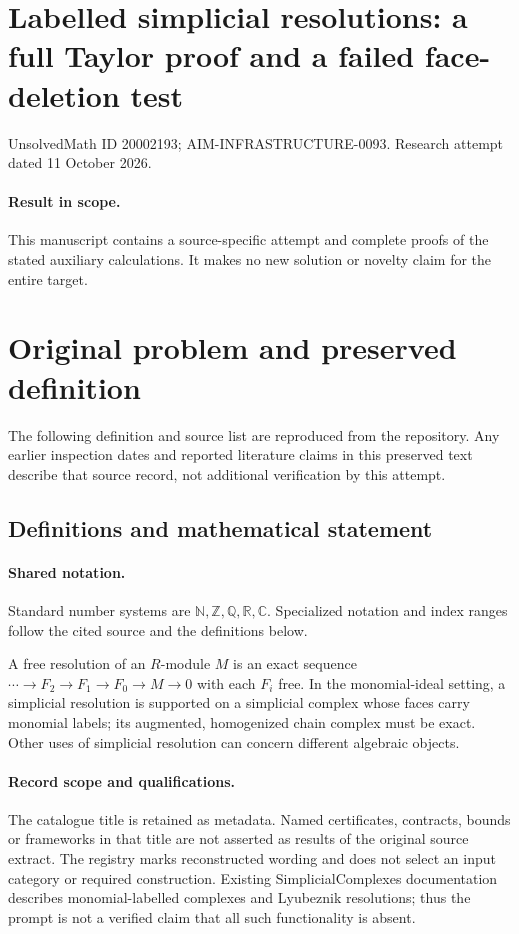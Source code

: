 \documentclass[11pt]{article}
\begin{document}
\section*{Labelled simplicial resolutions: a full Taylor proof and a failed face-deletion test}
\noindent UnsolvedMath ID 20002193; AIM-INFRASTRUCTURE-0093. Research attempt dated 11 October 2026.
\paragraph{Result in scope.}This manuscript contains a source-specific attempt and complete proofs of the stated auxiliary calculations. It makes no new solution or novelty claim for the entire target.
\section{Original problem and preserved definition}
The following definition and source list are reproduced from the repository. Any earlier inspection dates and reported literature claims in this preserved text describe that source record, not additional verification by this attempt.
\subsection{Definitions and mathematical statement}

\paragraph{Shared notation.}Standard number systems are $\mathbb N,\mathbb Z,\mathbb Q,\mathbb R,\mathbb C$. Specialized notation and index ranges follow the cited source and the definitions below.


A free resolution of an $R$-module $M$ is an exact sequence $\cdots\to F_2\to F_1\to F_0\to M\to0$ with each $F_i$ free. In the monomial-ideal setting, a simplicial resolution is supported on a simplicial complex whose faces carry monomial labels; its augmented, homogenized chain complex must be exact. Other uses of simplicial resolution can concern different algebraic objects.
\paragraph{Record scope and qualifications.}
The catalogue title is retained as metadata. Named certificates, contracts, bounds or frameworks in that title are not asserted as results of the original source extract.
The registry marks reconstructed wording and does not select an input category or required construction. Existing SimplicialComplexes documentation describes monomial-labelled complexes and Lyubeznik resolutions; thus the prompt is not a verified claim that all such functionality is absent.
\end{document}
